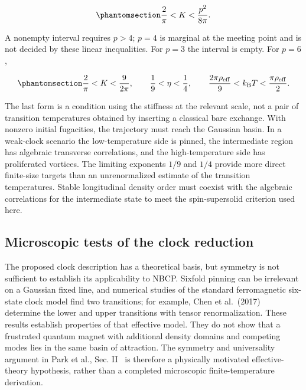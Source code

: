 \begin{equation}\phantomsection\label{eq-nbcp-clock-window}{
\frac{2}{\pi}<K<\frac{p^2}{8\pi}.
}\end{equation}

A nonempty interval requires \(p>4\); \(p=4\) is marginal at the meeting
point and is not decided by these linear inequalities. For \(p=3\) the
interval is empty. For \(p=6\),

\begin{equation}\phantomsection\label{eq-nbcp-clock-sixfold-window}{
\frac{2}{\pi}<K<\frac{9}{2\pi},\qquad
\frac19<\eta<\frac14,\qquad
\frac{2\pi\rho_{\rm eff}}9<k_{\rm B}T<\frac{\pi\rho_{\rm eff}}2.
}\end{equation}

The last form is a condition using the stiffness at the relevant scale,
not a pair of transition temperatures obtained by inserting a classical
bare exchange. With nonzero initial fugacities, the trajectory must
reach the Gaussian basin. In a weak-clock scenario the low-temperature
side is pinned, the intermediate region has algebraic transverse
correlations, and the high-temperature side has proliferated vortices.
The limiting exponents \(1/9\) and \(1/4\) provide more direct
finite-size targets than an unrenormalized estimate of the transition
temperatures. Stable longitudinal density order must coexist with the
algebraic correlations for the intermediate state to meet the
spin-supersolid criterion used here.

\subsection{Microscopic tests of the clock
reduction}\label{sec-nbcp-clock-matching-tests}

The proposed clock description has a theoretical basis, but symmetry is
not sufficient to establish its applicability to NBCP. Sixfold pinning
can be irrelevant on a Gaussian fixed line, and numerical studies of the
standard ferromagnetic six-state clock model find two transitions; for
example, Chen et al.~(2017)~\cite{chen2017}
determine the lower and upper transitions with tensor renormalization.
These results establish properties of that effective model. They do not
show that a frustrated quantum magnet with additional density domains
and competing modes lies in the same basin of attraction. The symmetry
and universality argument in
Park et al., Sec. II~\cite{park2026} is
therefore a physically motivated effective-theory hypothesis, rather
than a completed microscopic finite-temperature derivation.

